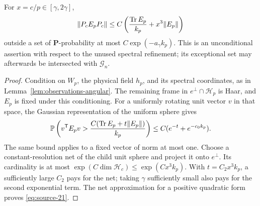 \begin{lemma}\label{lem:variance-compression}
For $x=c/p\in[\gamma,2\gamma]$,
\begin{equation}\label{eq:source-21}
 \|P_cE_pP_c\|
 \le C\left(\frac{\operatorname{Tr} E_p}{k_p}+x^3\|E_p\|\right)
\end{equation}
outside a set of $\mathbf P$-probability at most
$C\exp(-a_\gamma k_p)$. This is an unconditional assertion with respect
to the unused spectral refinement; its exceptional set may afterwards
be intersected with $\mathcal G_n$.
\end{lemma}

\begin{proof}
Condition on $W_p$, the physical field $h_p$, and its spectral coordinates,
as in Lemma~\ref{lem:observations-angular}. The remaining frame in
$e^\perp\cap\mathcal H_p$ is Haar, and $E_p$ is fixed under this
conditioning. For a uniformly rotating unit vector $v$ in that space,
the Gaussian representation of the uniform sphere gives
\[
 \mathbb P\left(v^{\mathsf T}E_pv>
   \frac{C(\operatorname{Tr} E_p+t\|E_p\|)}{k_p}\right)
 \le C(e^{-t}+e^{-c_0k_p}).
\]
The same bound applies to a fixed vector of norm at most one. Choose a
constant-resolution net of the child unit sphere and project it onto
$e^\perp$. Its cardinality is at most
$\exp(C\dim\mathcal H_c)\le\exp(Cx^3k_p)$. With
$t=C_2x^3k_p$, a sufficiently large $C_2$ pays for the net; taking
$\gamma$ sufficiently small also pays for the second exponential term.
The net approximation for a positive quadratic form proves
\eqref{eq:source-21}.
\end{proof}

